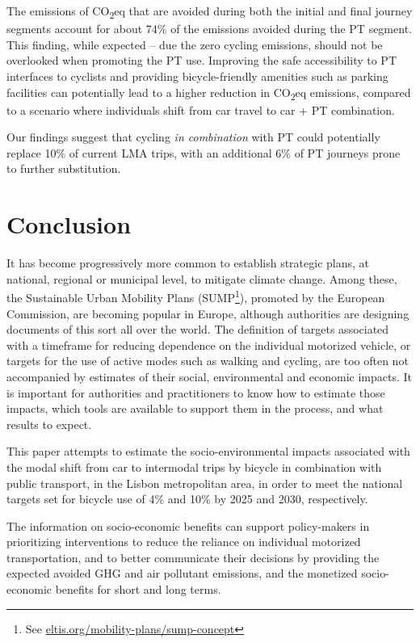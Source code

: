 \documentclass[review, doubleblind, 3p,
authoryear]{elsarticle} %
\begin{document}
The emissions of CO\textsubscript{2}eq that are avoided during both the
initial and final journey segments account for about 74\% of the
emissions avoided during the PT segment. This finding, while expected --
due the zero cycling emissions, should not be overlooked when promoting
the PT use. Improving the safe accessibility to PT interfaces to
cyclists and providing bicycle-friendly amenities such as parking
facilities can potentially lead to a higher reduction in
CO\textsubscript{2}eq emissions, compared to a scenario where
individuals shift from car travel to car + PT combination.

Our findings suggest that cycling \emph{in combination} with PT could
potentially replace 10\% of current LMA trips, with an additional 6\% of
PT journeys prone to further substitution.

\hypertarget{conclusion}{%
\section{Conclusion}\label{conclusion}}

It has become progressively more common to establish strategic plans, at
national, regional or municipal level, to mitigate climate change. Among
these, the Sustainable Urban Mobility Plans (SUMP\footnote{See
  \href{https://www.eltis.org/mobility-plans/sump-concept}{eltis.org/mobility-plans/sump-concept}}),
promoted by the European Commission, are becoming popular in Europe,
although authorities are designing documents of this sort all over the
world. The definition of targets associated with a timeframe for
reducing dependence on the individual motorized vehicle, or targets for
the use of active modes such as walking and cycling, are too often not
accompanied by estimates of their social, environmental and economic
impacts. It is important for authorities and practitioners to know how
to estimate those impacts, which tools are available to support them in
the process, and what results to expect.

This paper attempts to estimate the socio-environmental impacts
associated with the modal shift from car to intermodal trips by bicycle
in combination with public transport, in the Lisbon metropolitan area,
in order to meet the national targets set for bicycle use of 4\% and
10\% by 2025 and 2030, respectively.

The information on socio-economic benefits can support policy-makers in
prioritizing interventions to reduce the reliance on individual
motorized transportation, and to better communicate their decisions by
providing the expected avoided GHG and air pollutant emissions, and the
monetized socio-economic benefits for short and long terms.
\end{document}

